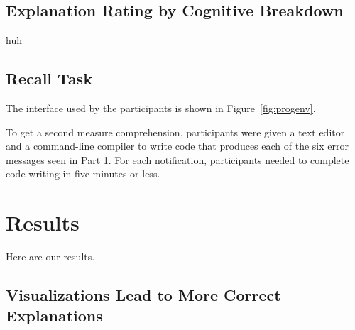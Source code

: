 \documentclass[conference]{IEEEtran}
\begin{document}
\subsection{Explanation Rating by Cognitive Breakdown}

huh



\subsection{Recall Task}

The interface used by the participants is shown in Figure~\ref{fig:progenv}.

To get a second measure comprehension, participants were given  a text editor and a command-line compiler to write code that produces each of the six error messages seen in Part 1.  For each notification, participants needed to complete code writing in five minutes or less.

\section{Results}

Here are our results.

\subsection{Visualizations Lead to More Correct Explanations}
\label{subsec:result:explanation}
\end{document}
